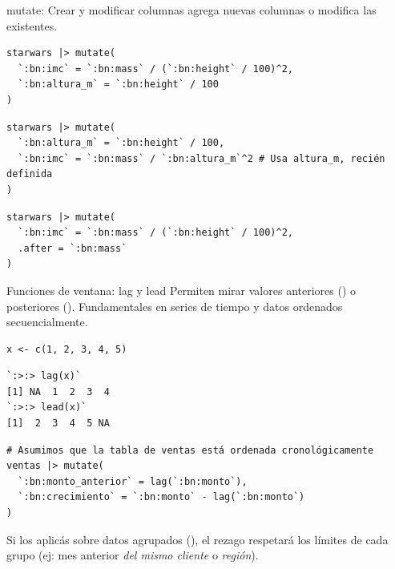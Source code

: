 \documentclass[8pt]{beamer}
\begin{document}
\begin{frame}[fragile]{mutate: Crear y modificar columnas}
	 agrega nuevas columnas o modifica las existentes.
\begin{lstlisting}[style=RScript]
starwars |> mutate(
  `:bn:imc` = `:bn:mass` / (`:bn:height` / 100)^2,
  `:bn:altura_m` = `:bn:height` / 100
)
\end{lstlisting}

\begin{lstlisting}[style=RScript]
starwars |> mutate(
  `:bn:altura_m` = `:bn:height` / 100,
  `:bn:imc` = `:bn:mass` / `:bn:altura_m`^2 # Usa altura_m, recién definida
)
\end{lstlisting}

\begin{lstlisting}[style=RScript]
starwars |> mutate(
  `:bn:imc` = `:bn:mass` / (`:bn:height` / 100)^2,
  .after = `:bn:mass`
)
\end{lstlisting}
\end{frame}





\begin{frame}[fragile]{Funciones de ventana: lag y lead}
	Permiten mirar valores anteriores () o posteriores (). Fundamentales en series de tiempo y datos ordenados secuencialmente.
	\begin{lstlisting}[style=RScript]
x <- c(1, 2, 3, 4, 5)
\end{lstlisting}

\begin{lstlisting}[style=RConsole]
`:>:> lag(x)`
[1] NA  1  2  3  4
`:>:> lead(x)`
[1]  2  3  4  5 NA
\end{lstlisting}
	
\begin{lstlisting}[style=RScript]
# Asumimos que la tabla de ventas está ordenada cronológicamente
ventas |> mutate(
  `:bn:monto_anterior` = lag(`:bn:monto`),
  `:bn:crecimiento` = `:bn:monto` - lag(`:bn:monto`)
)
\end{lstlisting}

	\begin{alertblock}{}
		Si los aplicás sobre datos agrupados (), el rezago respetará los límites de cada grupo (ej: mes anterior \emph{del mismo cliente} o \emph{región}).
	\end{alertblock}
\end{frame}
\end{document}
